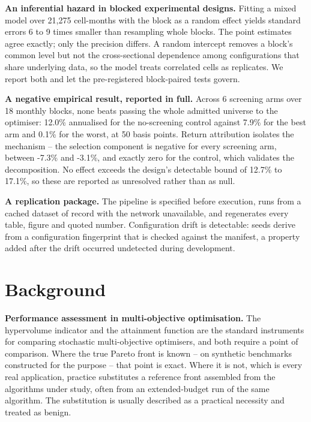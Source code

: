 \documentclass[preprint,11pt,authoryear]{elsarticle}
\begin{document}
\textbf{An inferential hazard in blocked experimental designs.} Fitting a mixed model over 21,275 cell-months with the block as a random effect yields standard errors 6 to 9 times smaller than resampling whole blocks. The point estimates agree exactly; only the precision differs. A random intercept removes a block's common level but not the cross-sectional dependence among configurations that share underlying data, so the model treats correlated cells as replicates. We report both and let the pre-registered block-paired tests govern.

\textbf{A negative empirical result, reported in full.} Across 6 screening arms over 18 monthly blocks, none beats passing the whole admitted universe to the optimiser: 12.0\% annualised for the no-screening control against 7.9\% for the best arm and 0.1\% for the worst, at 50 basis points. Return attribution isolates the mechanism -- the selection component is negative for every screening arm, between -7.3\% and -3.1\%, and exactly zero for the control, which validates the decomposition. No effect exceeds the design's detectable bound of 12.7\% to 17.1\%, so these are reported as unresolved rather than as null.

\textbf{A replication package.} The pipeline is specified before execution, runs from a cached dataset of record with the network unavailable, and regenerates every table, figure and quoted number. Configuration drift is detectable: seeds derive from a configuration fingerprint that is checked against the manifest, a property added after the drift occurred undetected during development.


\section{Background}\label{sec:background}

\textbf{Performance assessment in multi-objective optimisation.} The hypervolume indicator \citep{zitzler1999} and the attainment function \citep{fonseca1996} are the standard instruments for comparing stochastic multi-objective optimisers, and both require a point of comparison. Where the true Pareto front is known -- on synthetic benchmarks constructed for the purpose -- that point is exact. Where it is not, which is every real application, practice substitutes a reference front assembled from the algorithms under study, often from an extended-budget run of the same algorithm. The substitution is usually described as a practical necessity and treated as benign.
\end{document}
